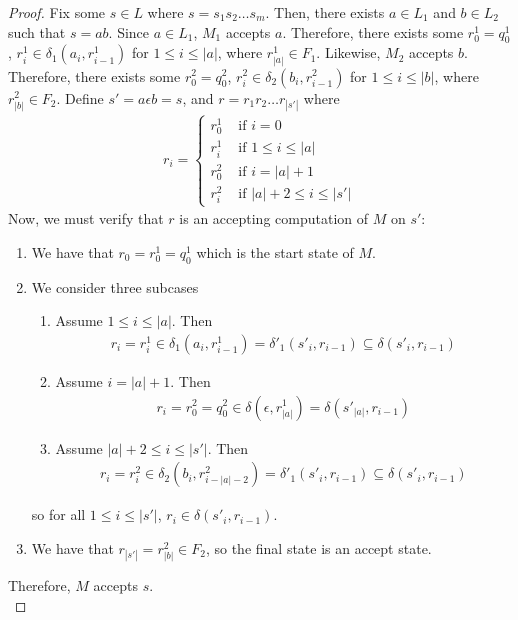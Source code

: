 \documentclass{article}
\begin{document}
\begin{proof}
    \noindent
    Fix some $s \in L$ where $s = s_1 s_2 \ldots s_m$. Then, there exists $a \in L_1$ and $b \in L_2$ such that $s = a b$. Since $a \in L_1$, $M_1$ 
    accepts $a$. Therefore, there exists some $r_0^1 = q_0^1$, $r_i^1 \in \delta_1(a_i, r_{i-1}^1)$ for $1 \leq i \leq |a|$, where $r_{|a|}^1 \in F_1$. Likewise, 
    $M_2$ accepts $b$. Therefore, there exists some $r_0^2 = q_0^2$, $r_i^2 \in \delta_2(b_i, r_{i-1}^2)$ for $1 \leq i \leq |b|$, where $r_{|b|}^2 \in F_2$. 
    Define $s' = a \epsilon b = s$, and $r = r_1 r_2 \ldots r_{|s'|}$ where
    \begin{align*}
        r_{i} = \begin{cases}
            r_0^1 & \text{ if } i = 0 \\
            r_i^1 & \text{ if } 1 \leq i \leq |a| \\
            r_0^2 & \text{ if } i = |a| + 1 \\
            r_i^2 & \text{ if } |a| + 2 \leq i \leq |s'|
        \end{cases}
    \end{align*}
    Now, we must verify that $r$ is an accepting computation of $M$ on $s'$:
    \begin{enumerate}
        \item We have that $r_0 = r_0^1 = q_0^1$ which is the start state of $M$.
        \item We consider three subcases
        \begin{enumerate}
            \item Assume $1 \leq i \leq |a|$. Then 
            \begin{align*}
                r_i = r_i^1 \in \delta_1(a_i, r_{i-1}^1) = \delta'_1(s'_i, r_{i-1}) \subseteq \delta(s'_i, r_{i-1})
            \end{align*}

            \item Assume $i = |a| + 1$. Then 
            \begin{align*}
                r_i = r_0^2 = q_0^2 \in \delta(\epsilon, r_{|a|}^1) = \delta(s'_{|a|}, r_{i-1}) 
            \end{align*}

            \item Assume $|a| + 2 \leq i \leq |s'|$. Then
            \begin{align*}
                r_i = r_i^2 \in \delta_2(b_i, r_{i-|a|-2}^2) = \delta'_1(s'_i, r_{i-1}) \subseteq \delta(s'_i, r_{i-1})
            \end{align*}
        \end{enumerate}
        so for all $1 \leq i \leq |s'|$, $r_i \in \delta(s'_i, r_{i-1})$.
        \item We have that $r_{|s'|} = r_{|b|}^2 \in F_2$, so the final state is an accept state.
    \end{enumerate}
    Therefore, $M$ accepts $s$. \\


\end{proof}
\end{document}
